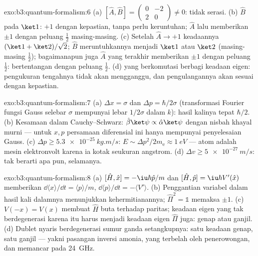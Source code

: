 \begin{solution}{exo:b3:quantum-formalism:6}
(a) $[\hat A, \hat B] = \begin{pmatrix}0 & -2\\ 2 & 0\end{pmatrix}
\neq 0$: tidak serasi. (b) $\hat B$ pada $\ket1$: $+1$ dengan
kepastian, tanpa perlu keruntuhan; $\hat A$ lalu memberikan $\pm1$ dengan
peluang $\tfrac12$ masing-masing. (c) Setelah $\hat A \to +1$ keadaannya
$(\ket1 + \ket2)/\sqrt2$; $\hat B$ meruntuhkannya menjadi $\ket1$ atau
$\ket2$ (masing-masing $\tfrac12$); bagaimanapun juga $\hat A$ yang
terakhir memberikan $\pm1$ dengan peluang $\tfrac12$: bertentangan
dengan peluang $\tfrac12$. (d)  yang berkomutasi berbagi
keadaan eigen: pengukuran tengahnya tidak akan mengganggu, dan
pengulangannya akan sesuai dengan kepastian.
\end{solution}

\begin{solution}{exo:b3:quantum-formalism:7}
(a) $\Delta x = \sigma$ dan $\Delta p = \hbar/2\sigma$ (transformasi
Fourier fungsi Gauss selebar $\sigma$ mempunyai lebar $1/2\sigma$ dalam
$k$): hasil kalinya tepat $\hbar/2$. (b) Kesamaan dalam Cauchy--Schwarz:
$\hat\beta\ket\psi \propto \hat\alpha\ket\psi$ dengan nisbah khayal
murni --- untuk $x, p$ persamaan diferensial ini hanya mempunyai
penyelesaian Gauss. (c) $\Delta p \ge \qty{5.3e-25}{kg.m/s}$: $E \sim
\Delta p^2/2m_{\text{e}} \approx \qty{1}{eV}$ --- atom adalah mesin
elektronvolt karena ia kotak seukuran angstrom. (d)
$\Delta v \ge \qty{5e-27}{m/s}$: tak berarti apa pun, selamanya.
\end{solution}

\begin{solution}{exo:b3:quantum-formalism:8}
(a) $[\hat H, \hat x] = -\iu\hbar\hat p/m$ dan $[\hat H, \hat p] =
\iu\hbar V'(\hat x)$ memberikan $\dd\langle x\rangle/\dd t = \langle
p\rangle/m$, $\dd\langle p\rangle/\dd t = -\langle V'\rangle$. (b)
Penggantian variabel dalam hasil kali dalamnya menunjukkan
kehermitianannya; $\hat\Pi^2 = \mathbb 1$ memaksa  $\pm1$. (c) $V(-x) =
V(x)$ membuat $\hat H$ buta terhadap paritas; keadaan eigen yang tak
berdegenerasi karena itu harus menjadi keadaan eigen $\hat\Pi$ juga:
genap atau ganjil. (d) Dublet nyaris berdegenerasi sumur ganda
setangkupnya: satu keadaan genap, satu ganjil --- yakni pasangan inversi
amonia, yang terbelah oleh penerowongan, dan memancar pada \qty{24}{GHz}.
\end{solution}

